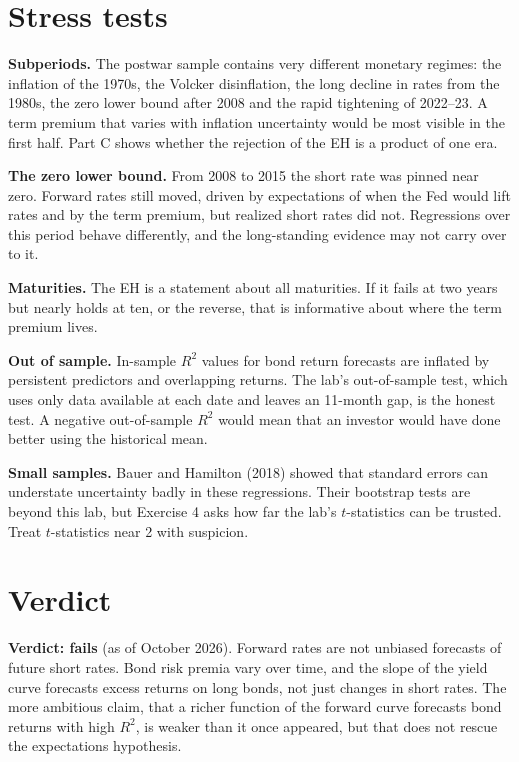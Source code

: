 \section{Stress tests}
\label{sec:16-stress}

\textbf{Subperiods.} The postwar sample contains very different monetary regimes: the inflation of the 1970s, the Volcker disinflation, the long decline in rates from the 1980s, the zero lower bound after 2008 and the rapid tightening of 2022--23. A term premium that varies with inflation uncertainty would be most visible in the first half. Part C shows whether the rejection of the EH is a product of one era.

\textbf{The zero lower bound.} From 2008 to 2015 the short rate was pinned near zero. Forward rates still moved, driven by expectations of when the Fed would lift rates and by the term premium, but realized short rates did not. Regressions over this period behave differently, and the long-standing evidence may not carry over to it.

\textbf{Maturities.} The EH is a statement about all maturities. If it fails at two years but nearly holds at ten, or the reverse, that is informative about where the term premium lives.

\textbf{Out of sample.} In-sample $R^2$ values for bond return forecasts are inflated by persistent predictors and overlapping returns. The lab's out-of-sample test, which uses only data available at each date and leaves an 11-month gap, is the honest test. A negative out-of-sample $R^2$ would mean that an investor would have done better using the historical mean.

\textbf{Small samples.} Bauer and Hamilton (2018) showed that standard errors can understate uncertainty badly in these regressions. Their bootstrap tests are beyond this lab, but Exercise 4 asks how far the lab's $t$-statistics can be trusted. Treat $t$-statistics near 2 with suspicion.

\section{Verdict}
\label{sec:16-verdict}

\begin{callout}
\textbf{Verdict: fails} (as of October 2026). Forward rates are not unbiased forecasts of future short rates. Bond risk premia vary over time, and the slope of the yield curve forecasts excess returns on long bonds, not just changes in short rates. The more ambitious claim, that a richer function of the forward curve forecasts bond returns with high $R^2$, is weaker than it once appeared, but that does not rescue the expectations hypothesis.
\end{callout}

